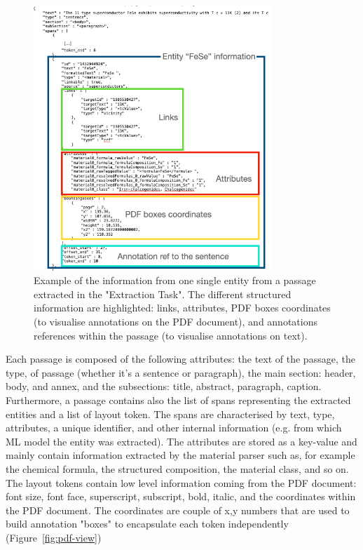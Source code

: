 \documentclass[a4paper]{article}
\begin{document}
\begin{figure}[ht]
  \centering
  \includegraphics[width=0.8\textwidth]{images/data-flow-2} 
  \caption{Example of the information from one single entity from a passage extracted in the "Extraction Task". The different structured information are highlighted: links, attributes, PDF boxes coordinates (to visualise annotations on the PDF document), and annotations references within the passage (to visualise annotations on text).}
  \label{fig:data-flow-2}
\end{figure}

Each passage is composed of the following attributes: the text of the passage, the type, of passage (whether it's a sentence or paragraph), the main section: header, body, and annex, and the subsections: title, abstract, paragraph, caption.
Furthermore, a passage contains also the list of spans representing the extracted entities and a list of layout token. 
The spans are characterised by text, type, attributes, a unique identifier, and other internal information (e.g. from which ML model the entity was extracted). 
The attributes are stored as a key-value and mainly contain information extracted by the material parser such as, for example the chemical formula, the structured composition, the material class, and so on.
The layout tokens contain low level information coming from the PDF document: font size, font face, superscript, subscript, bold, italic, and the coordinates within the PDF document. The coordinates are couple of x,y numbers that are used to build annotation "boxes" to encapsulate each token independently (Figure~\ref{fig:pdf-view}) 
\end{document}
